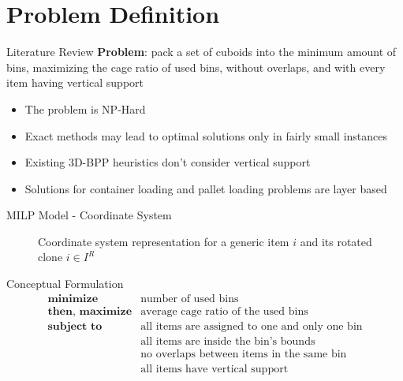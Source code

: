 \documentclass{beamer}
\begin{document}
    \section{Problem Definition}
    \begin{frame}{Literature Review}
        \textbf{Problem}: pack a set of cuboids into the minimum amount of bins, maximizing the cage ratio of used bins, without overlaps, and with every item having vertical support
        \begin{itemize}
            \item The problem is NP-Hard
            \item Exact methods may lead to optimal solutions only in fairly small instances %
            \item Existing 3D-BPP heuristics don't consider vertical support
            \item Solutions for container loading and pallet loading problems are layer based
        \end{itemize}
    \end{frame}

    \begin{frame}{MILP Model - Coordinate System}
        \begin{figure}
            \scalebox{0.45}{%
            
            }
            \caption*{Coordinate system representation for a generic item $i$ and its rotated clone $i \in I^R$}
            \label{fig:coordinate_system}
        \end{figure}
    \end{frame}

    \begin{frame}{Conceptual Formulation}
        \begin{eqnarray*}
            \textbf{minimize} & \text{number of used bins} \\
            \textbf{then, maximize} & \text{average cage ratio of the used bins} \\
            \textbf{subject to} & \text{all items are assigned to one and only one bin} \\
                                              & \text{all items are inside the bin's bounds} \\
                                              & \text{no overlaps between items in the same bin} \\
                                              & \text{all items have vertical support} \\
        \end{eqnarray*}
    \end{frame}
\end{document}
